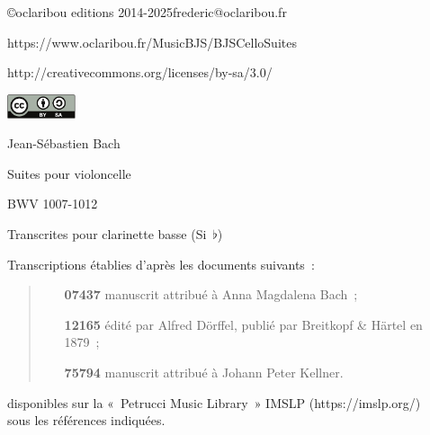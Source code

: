 \documentclass[a4paper,twoside]{article}
\newcommand{\anneecopyright}{2014-2025}
\begin{document}
\begin{titlepage}
{{\begin{center}
    \normalsize\sffamily
    
    \copyright oclaribou editions \anneecopyright\quad frederic@oclaribou.fr
    
    https://www.oclaribou.fr/MusicBJS/BJSCelloSuites
        
    \bigskip
    
    \small
    http://creativecommons.org/licenses/by-sa/3.0/
    
    \smallskip
    
    \includegraphics[width=2cm]{inc/by-sa}

    \end{center}
    \vspace*{0pt plus 0.1 fill}
  }}\hspace*{\fill}
  \vspace*{\fill}
\end{titlepage}
\restoregeometry

\cleardoublepage
   \vspace*{\fill}
    \begin{center}
      \LARGE
      Jean-Sébastien Bach
      
      \bigskip
      
      \Huge
      Suites pour violoncelle
      
      \bigskip
      
      \Large
      BWV 1007-1012
      
      \bigskip
      Transcrites pour clarinette basse (Si~\(\flat\))
      
  \vspace*{\fill}

  \hspace*{1.8cm}\parbox{0.7\textwidth}{%
    \large
	Transcriptions établies d'après les documents suivants~:
	\quad\begin{quote}
	\begin{itemize}
	  \item[\textbf{07437}] manuscrit attribué à Anna Magdalena Bach~;

	  \item[\textbf{12165}] édité par Alfred Dörffel, publié par Breitkopf \& Härtel en 1879~;

	  \item[\textbf{75794}] manuscrit attribué à Johann Peter Kellner.
	\end{itemize}
	\end{quote}
	disponibles sur la «~Petrucci Music Library~» IMSLP (\textsf{https://imslp.org/}) \\
	sous les références indiquées.
  }


    \end{center}
  
\end{document}
